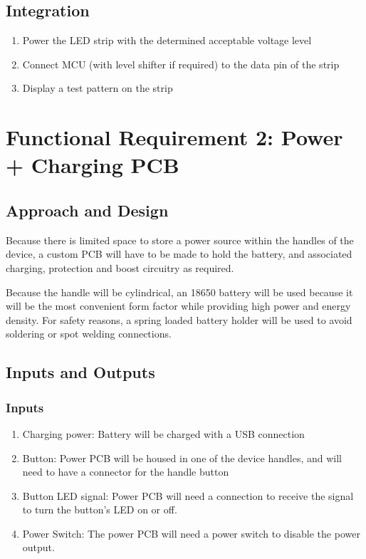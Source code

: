 \documentclass{notes}
\begin{document}
\subsection{Integration}
\begin{enumerate}
    \item Power the LED strip with the determined acceptable voltage level
    \item Connect MCU (with level shifter if required) to the data pin of the strip
    \item Display a test pattern on the strip
\end{enumerate}

\section{Functional Requirement 2: Power + Charging PCB}
\label{sec:fr2}

\subsection{Approach and Design}

Because there is limited space to store a power source within the handles of the device, a custom PCB will have to be made to hold the battery, and associated charging, protection and boost circuitry as required.

Because the handle will be cylindrical, an 18650 battery will be used because it will be the most convenient form factor while providing high power and energy density.
For safety reasons, a spring loaded battery holder will be used to avoid soldering or spot welding connections.

\subsection{Inputs and Outputs}

\subsubsection{Inputs}

\begin{enumerate}
    \item Charging power: Battery will be charged with a USB connection
    \item Button: Power PCB will be housed in one of the device handles, and will need to have a connector for the handle button
    \item Button LED signal: Power PCB will need a connection to receive the signal to turn the button's LED on or off.
    \item Power Switch: The power PCB will need a power switch to disable the power output.
\end{enumerate}
\end{document}
